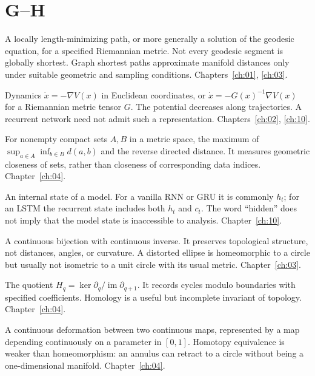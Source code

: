 \section*{G--H}
\begin{description}[style=nextline]
\item[Geodesic.] A locally length-minimizing path, or more generally a solution of the geodesic equation, for a specified Riemannian metric. Not every geodesic segment is globally shortest. Graph shortest paths approximate manifold distances only under suitable geometric and sampling conditions. Chapters~\ref{ch:01}, \ref{ch:03}.
\item[Gradient flow.] Dynamics $\dot x=-\nabla V(x)$ in Euclidean coordinates, or $\dot x=-G(x)^{-1}\nabla V(x)$ for a Riemannian metric tensor $G$. The potential decreases along trajectories. A recurrent network need not admit such a representation. Chapters~\ref{ch:02}, \ref{ch:10}.
\item[Hausdorff distance.] For nonempty compact sets $A,B$ in a metric space, the maximum of $\sup_{a\in A}\inf_{b\in B}d(a,b)$ and the reverse directed distance. It measures geometric closeness of sets, rather than closeness of corresponding data indices. Chapter~\ref{ch:04}.
\item[Hidden state.] An internal state of a model. For a vanilla RNN or GRU it is commonly $h_t$; for an LSTM the recurrent state includes both $h_t$ and $c_t$. The word ``hidden'' does not imply that the model state is inaccessible to analysis. Chapter~\ref{ch:10}.
\item[Homeomorphism.] A continuous bijection with continuous inverse. It preserves topological structure, not distances, angles, or curvature. A distorted ellipse is homeomorphic to a circle but usually not isometric to a unit circle with its usual metric. Chapter~\ref{ch:03}.
\item[Homology.] The quotient $H_q=\ker\partial_q/\operatorname{im}\partial_{q+1}$. It records cycles modulo boundaries with specified coefficients. Homology is a useful but incomplete invariant of topology. Chapter~\ref{ch:04}.
\item[Homotopy.] A continuous deformation between two continuous maps, represented by a map depending continuously on a parameter in $[0,1]$. Homotopy equivalence is weaker than homeomorphism: an annulus can retract to a circle without being a one-dimensional manifold. Chapter~\ref{ch:04}.
\end{description}

